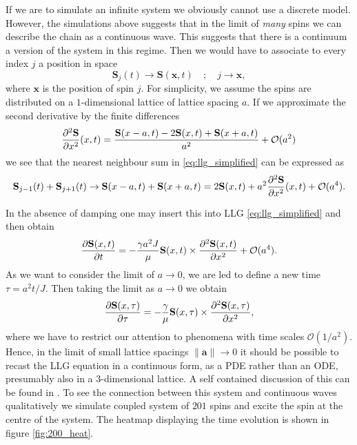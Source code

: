 \begin{remark}


If we are to simulate an infinite system we obviously cannot use a discrete model. However, the simulations above suggests that in the limit of \textit{many} spins we can describe the chain as a continuous wave. This suggests that there is a continuum a version of the system in this regime. Then we would have to associate to every index $j$ a position in space 
$$
	\mathbf{S}_j(t) \to \mathbf{S}(\mathbf{x},t) \quad ; \quad j \to \mathbf{x},
$$
where $\mathbf{x}$ is the position of spin $j$. For simplicity, we assume the spins are distributed on a $1$-dimensional lattice of lattice spacing $a$. 
If we approximate the second derivative by the finite differences 
$$
	  \frac{\partial^2 \mathbf{S}}{\partial x^2}(x,t) = \frac{\mathbf{S}(x - a,t) - 2 \mathbf{S}(x,t) + \mathbf{S}(x + a,t) }{ a^2} + \mathcal{O}(a^2)
$$
we see that the nearest neighbour sum in \eqref{eq:llg_simplified} can be expressed as
$$
	\mathbf{S}_{j-1}(t) + \mathbf{S}_{j+1}(t) \to \mathbf{S}(x-a,t) + \mathbf{S}(x+a,t) = 2 \mathbf{S}(x,t) + a^2 \frac{\partial^2 \mathbf{S}}{\partial x^2} (x,t) + \mathcal{O}(a^4).
$$

In the absence of damping one may insert this into LLG \eqref{eq:llg_simplified} and then obtain 
$$
	\frac{\partial \mathbf{S}(x,t)}{\partial t} = -\frac{\gamma a^2 J}{\mu} \mathbf{S}(x,t) \times \frac{\partial^2 \mathbf{S}(x,t)}{\partial x^2} + \mathcal{O}(a^4).
$$
As we want to consider the limit of $a \to 0$, we are led to define a new time $\tau = a^2 t/J$. Then taking the limit as $a\to 0$ we obtain
$$
\frac{\partial \mathbf{S}(x,\tau)}{\partial \tau} = -\frac{\gamma}{\mu} \mathbf{S}(x,\tau) \times \frac{\partial^2 \mathbf{S}(x,\tau)}{\partial x^2},
$$
where we have to restrict our attention to phenomena with time scales $\mathcal{O}(1/a^2)$. Hence, in the limit of small lattice spacings $\|\mathbf{a}\| \to 0$ it should be possible to recast the LLG equation in a continuous form, as a PDE rather than an ODE, presumably also in a $3$-dimensional lattice. A self contained discussion of this can be found in \cite{Lakshmanan2011}. To see the connection between this system and continuous waves qualitatively we simulate coupled system of $201$ spins and excite the spin at the centre of the system. The heatmap displaying the time evolution is shown in figure \ref{fig:200_heat}.


\end{remark}
